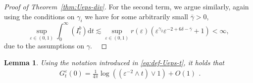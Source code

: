 \documentclass[11pt, a4paper]{scrartcl}
\numberwithin{equation}{section}
\theoremstyle{plain}
\newtheorem{lemma}[foo]{Lemma}
\theoremstyle{remark}
\newcommand{\mathd}{\mathrm{d}}
\begin{document}
\begin{proof}[Proof of Theorem~\ref{thm:Ueps-div}]
  For the second term, we argue similarly, again using the conditions on
  $\gamma_i$ we have for some arbitrarily small $\bar{\gamma} > 0$,
  \[ \sup_{\varepsilon \in (0, 1)} \int_0^{\infty} (I_t^b) \mathd t \lesssim
     \sup_{\varepsilon \in (0, 1)} r (\varepsilon) (\varepsilon^{\gamma_2}
     \varepsilon^{- 2 + 6 \delta - \bar{\gamma}} + 1) < \infty, \]
  due to the assumptions on $\gamma$. \ 
\end{proof}

\begin{lemma}
  \label{lem:Geps}Using the notation introduced in \eqref{eq:def-Ueps-t}, it
  holds that
  \begin{equation}
    \begin{aligned}
      G_t^{\varepsilon} (0) = \frac{1}{4 \pi} \log ((\varepsilon^{- 2} \wedge
      t) \vee 1) + O (1)
    \end{aligned} . \label{eq:Geps-log}
  \end{equation}
\end{lemma}
\end{document}
